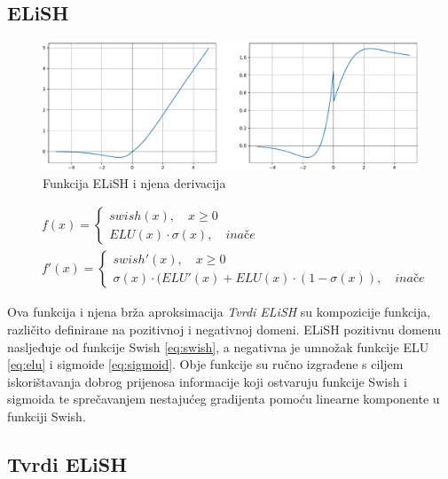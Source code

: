 \documentclass[times, utf8, numeric, diplomski]{fer}
\def\otherwise{\textit{inače}}
\begin{document}
\subsection{ELiSH}
\label{func:elish}

\begin{figure}[H]
\includegraphics[width=\textwidth]{ELiSH.pdf}
\centering
\caption{Funkcija ELiSH i njena derivacija}
\label{fig:elish}
\end{figure}

\begin{equation}
\begin{split}
&f(x) = 
	\begin{cases}
		swish(x), \quad x \geq 0 \\
		ELU(x) \cdot \sigma(x), \quad \otherwise
	\end{cases} \\
&f'(x) =
	\begin{cases}
		swish'(x), \quad x \geq 0 \\
		\sigma(x) \cdot (ELU'(x) + ELU(x) \cdot (1-\sigma(x)), \quad \otherwise
	\end{cases}
\end{split}
\end{equation}

Ova funkcija i njena brža aproksimacija \textit{Tvrdi ELiSH} su kompozicije funkcija, različito definirane na pozitivnoj i negativnoj domeni. ELiSH pozitivnu domenu nasljeđuje od funkcije Swish \eqref{eq:swish}, a negativna je umnožak funkcije ELU \eqref{eq:elu} i sigmoide \eqref{eq:sigmoid}. Obje funkcije su ručno izgrađene s ciljem iskorištavanja dobrog prijenosa informacije koji ostvaruju funkcije Swish i sigmoida te sprečavanjem nestajućeg gradijenta pomoću linearne komponente u funkciji Swish. \citep{elish}

\subsection{Tvrdi ELiSH}
\label{func:hard_elish}
\end{document}
